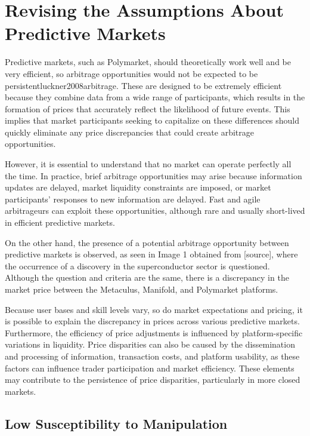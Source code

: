 \section{Revising the Assumptions About Predictive Markets}
\label{sec:revising_assumptions}
Predictive markets, such as Polymarket, should theoretically work well and be very efficient, so arbitrage opportunities would not be expected to be persistent{luckner2008arbitrage}. These are designed to be extremely efficient because they combine data from a wide range of participants, which results in the formation of prices that accurately reflect the likelihood of future events. This implies that market participants seeking to capitalize on these differences should quickly eliminate any price discrepancies that could create arbitrage opportunities.

However, it is essential to understand that no market can operate perfectly all the time. In practice, brief arbitrage opportunities may arise because information updates are delayed, market liquidity constraints are imposed, or market participants' responses to new information are delayed. Fast and agile arbitrageurs can exploit these opportunities, although rare and usually short-lived in efficient predictive markets.

On the other hand, the presence of a potential arbitrage opportunity between predictive markets is observed, as seen in Image 1 obtained from [source], where the occurrence of a discovery in the superconductor sector is questioned. Although the question and criteria are the same, there is a discrepancy in the market price between the Metaculus, Manifold, and Polymarket platforms.

Because user bases and skill levels vary, so do market expectations and pricing, it is possible to explain the discrepancy in prices across various predictive markets. Furthermore, the efficiency of price adjustments is influenced by platform-specific variations in liquidity. Price disparities can also be caused by the dissemination and processing of information, transaction costs, and platform usability, as these factors can influence trader participation and market efficiency. These elements may contribute to the persistence of price disparities, particularly in more closed markets.

\subsection{Low Susceptibility to Manipulation}
\label{subsec:low_susceptibility_to_manipulation}


